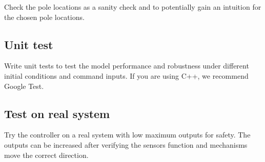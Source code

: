 Check the pole locations as a sanity check and to potentially gain an intuition
for the chosen pole locations.

\subsection{Unit test}

Write unit tests to test the \gls{model} performance and \gls{robustness} under
different initial conditions and command inputs. If you are using C++, we
recommend Google Test.

\subsection{Test on real system}

Try the controller on a real \gls{system} with low maximum outputs for safety.
The outputs can be increased after verifying the sensors function and mechanisms
move the correct direction.
